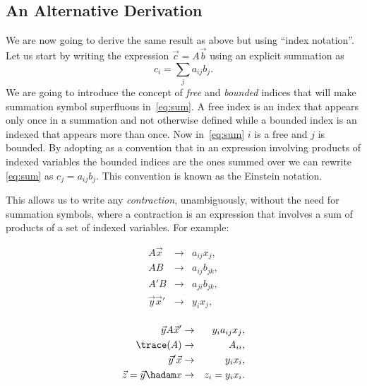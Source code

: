 \documentclass{article}
\begin{document}

\subsection{An Alternative Derivation}


We are now going to derive the same result as above but using ``index
notation''. Let us start by writing the expression \(\vec c = A \vec b\) using an
explicit summation as
\begin{equation}
	c_i = \sum_j a_{ij} b_j. \label{eq:sum}
\end{equation}
We are going to introduce the concept of \emph{free} and \emph{bounded} indices
that will make summation symbol superfluous in~\ref{eq:sum}. A free index is an
index that appears only once in a summation and not otherwise defined while a
bounded index is an indexed that appears more than once. Now in~\ref{eq:sum}
\(i\) is a free and \(j\) is bounded. By adopting as a convention that in an
expression involving products of indexed variables the bounded indices are the
ones summed over we can rewrite \ref{eq:sum} as \(c_j = a_{ij} b_{j}\). This
convention is known as the Einstein notation.

This allows us to write any \emph{contraction}, unambiguously, without the need
for summation symbols, where a contraction is an expression that involves a sum
of products of a set of indexed variables. For example:

\noindent
\begin{minipage}{.5\textwidth}
\begin{eqnarray*}
A \vec x &\rightarrow& a_{ij} x_j, \\
A B &\rightarrow& a_{ij} b_{jk}, \\
A' B &\rightarrow& a_{ji} b_{jk}, \\
\vec y \vec x' &\rightarrow& y_i x_j,\\
\end{eqnarray*}
\end{minipage}
\begin{minipage}{.5\textwidth}
\begin{eqnarray*}
\vec y A \vec x' &\rightarrow& y_i a_{ij} x_j, \\
\trace(A) &\rightarrow& A_{ii}, \\
\vec y' \vec x &\rightarrow& y_i x_i, \\
\vec z = \vec y \hadam x &\rightarrow& z_i = y_i x_i.\\
\end{eqnarray*}
\end{minipage}
\end{document}
